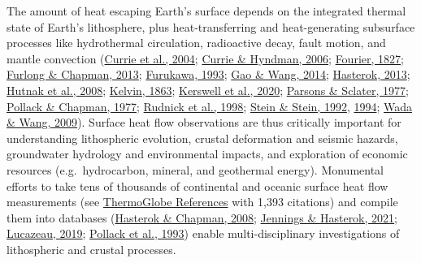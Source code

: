 The amount of heat escaping Earth's surface depends on the integrated thermal state of Earth's lithosphere, plus heat-transferring and heat-generating subsurface processes like hydrothermal circulation, radioactive decay, fault motion, and mantle convection (\protect\hyperlink{ref-currie2004}{Currie et al., 2004}; \protect\hyperlink{ref-currie2006}{Currie \& Hyndman, 2006}; \protect\hyperlink{ref-fourier1827}{Fourier, 1827}; \protect\hyperlink{ref-furlong2013}{Furlong \& Chapman, 2013}; \protect\hyperlink{ref-furukawa1993}{Furukawa, 1993}; \protect\hyperlink{ref-gao2014}{Gao \& Wang, 2014}; \protect\hyperlink{ref-hasterok2013}{Hasterok, 2013}; \protect\hyperlink{ref-hutnak2008}{Hutnak et al., 2008}; \protect\hyperlink{ref-kelvin1863}{Kelvin, 1863}; \protect\hyperlink{ref-kerswell2020}{Kerswell et al., 2020}; \protect\hyperlink{ref-parsons1977}{Parsons \& Sclater, 1977}; \protect\hyperlink{ref-pollack1977}{Pollack \& Chapman, 1977}; \protect\hyperlink{ref-rudnick1998}{Rudnick et al., 1998}; \protect\hyperlink{ref-stein1992}{Stein \& Stein, 1992}, \protect\hyperlink{ref-stein1994}{1994}; \protect\hyperlink{ref-wada2009}{Wada \& Wang, 2009}). Surface heat flow observations are thus critically important for understanding lithospheric evolution, crustal deformation and seismic hazards, groundwater hydrology and environmental impacts, and exploration of economic resources (e.g.~hydrocarbon, mineral, and geothermal energy). Monumental efforts to take tens of thousands of continental and oceanic surface heat flow measurements (see \protect\hyperlink{tglobe}{ThermoGlobe References} with 1,393 citations) and compile them into databases (\protect\hyperlink{ref-hasterok2008}{Hasterok \& Chapman, 2008}; \protect\hyperlink{ref-jennings2021}{Jennings \& Hasterok, 2021}; \protect\hyperlink{ref-lucazeau2019}{Lucazeau, 2019}; \protect\hyperlink{ref-pollack1993}{Pollack et al., 1993}) enable multi-disciplinary investigations of lithospheric and crustal processes.

